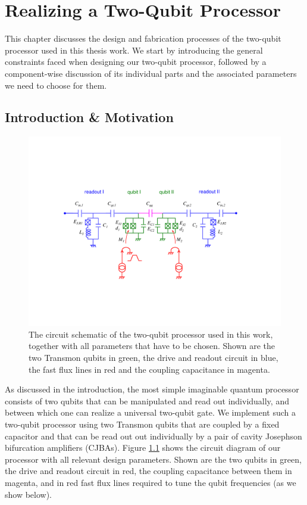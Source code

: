\chapter{Realizing a Two-Qubit Processor} \label{chapter:design}

This chapter discusses the design and fabrication processes of the two-qubit processor used in this thesis work. We start by introducing the general constraints faced when designing our two-qubit processor, followed by a component-wise discussion of its individual parts and the associated parameters we need to choose for them.

\section{Introduction \& Motivation}

\begin{figure}[ht!]
  \centering
	\includegraphics[width=1.\textwidth]{"./material/figures/2-qubit-processor/processor_schematic_parameters"}
	\caption[Circuit schematic of the two-qubit processor]{The circuit schematic of the two-qubit processor used in this work, together with all parameters that have to be chosen. Shown are the two Transmon qubits in green, the drive and readout circuit in blue, the fast flux lines in red and the coupling capacitance in magenta.}
	\label{fig:2_qubit_chip_circuit_diagram}
\end{figure}

As discussed in the introduction, the most simple imaginable quantum processor consists of two qubits that can be manipulated and read out individually, and between which one can realize a universal two-qubit gate. We implement such a two-qubit processor using two Transmon qubits that are coupled by a fixed capacitor and that can be read out out individually by a pair of cavity Josephson bifurcation amplifiers (CJBAs). Figure \ref{fig:2_qubit_chip_circuit_diagram} shows the circuit diagram of our processor with all relevant design parameters. Shown are the two qubits in green, the drive and readout circuit in red, the coupling capacitance between them in magenta, and in red fast flux lines required to tune the qubit frequencies (as we show below).

